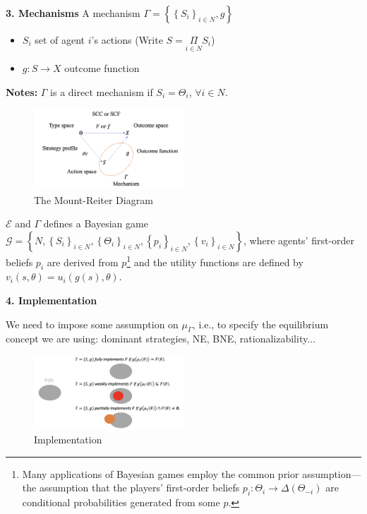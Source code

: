 \documentclass[11pt,leqno]{article}
\begin{document}
\textbf{3. Mechanisms}
A mechanism $\Gamma=\left\{ \left\{S_i\right\}_{i \in N},  g\right\}$
\begin{itemize}
    \item $S_{i}$ \quad set of agent $i$'s actions (Write $S=\underset{i\in N}{\Pi}S_{i}$)
    \item $g:S\to X$ \quad outcome function
\end{itemize}

\textbf{Notes:} $\Gamma$ is a direct mechanism if $S_{i}=\Theta_{i}$, $\forall i\in N$.

\begin{figure}[h]
    \centering
    \includegraphics[width=0.5\textwidth]{figure 1.png}
    \caption{The Mount-Reiter Diagram}
    \label{fig:1}
\end{figure}

$\mathcal{E}$ and $\Gamma$ defines a Bayesian game $\mathcal{G}=\left\{N,\left\{S_i\right\}_{i \in N}, \left\{\Theta_i\right\}_{i \in N}, \left\{p_i\right\}_{i \in N}, \left\{v_i\right\}_{i \in N}\right\}$, where agents'  first-order beliefs $p_{i}$ are derived from $p$\footnote{Many applications of Bayesian games employ the common prior assumption---the assumption that the players' first-order beliefs $p_{i}:\Theta_{i}\to \Delta(\Theta_{-i})$ are conditional probabilities generated from some $p$. } and the utility functions are defined by $v_{i}(s,\theta)=u_{i}(g(s),\theta)$.

\newpage

\textbf{4. Implementation}

We need to impose some assumption on $\mu_{\Gamma}$, i.e., to specify the equilibrium concept we are using: dominant strategies, NE, BNE, rationalizability... 

\begin{figure}[h]
    \centering
    \includegraphics[width=0.5\textwidth]{figure 2.png}
    \caption{Implementation}
    \label{fig:2}
\end{figure}
\end{document}
